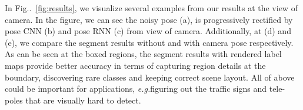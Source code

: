 \documentclass[10pt,twocolumn,letterpaper]{article}
\makeatletter
\newcommand{\figref}[1]{Fig\onedot~\ref{#1}}
\DeclareRobustCommand\onedot{\futurelet\@let@token\@onedot}
\def\onedot{\ifx\@let@token.\else.\null\fi\xspace}
\def\eg{\emph{e.g.}}
\def\wrt{w.r.t\onedot}
\makeatother
\begin{document}
In \figref{fig:results}, we visualize several examples from our results at the view of camera. In the figure, we can see the noisy pose (a), is progressively rectified by pose CNN (b) and pose RNN (c) from view of camera. 
Additionally, at (d) and (e), we compare the segment results without and with camera pose respectively. As can be seen at the boxed regions, the segment results with rendered label maps provide better accuracy in terms of capturing region details at the boundary, discovering rare classes and keeping correct scene layout. All of above could be important for applications, \eg figuring out the traffic signs and tele-poles that are visually hard to detect.
\end{document}

